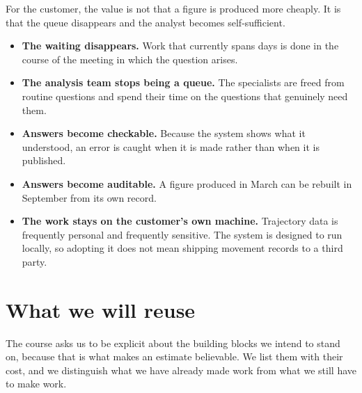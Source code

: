 \documentclass[12pt,a4paper]{report}
\begin{document}
For the customer, the value is not that a figure is produced more cheaply. It is
that the queue disappears and the analyst becomes self-sufficient.

\begin{itemize}
  \item \textbf{The waiting disappears.} Work that currently spans days is done
    in the course of the meeting in which the question arises.
  \item \textbf{The analysis team stops being a queue.} The specialists are
    freed from routine questions and spend their time on the questions that
    genuinely need them.
  \item \textbf{Answers become checkable.} Because the system shows what it
    understood, an error is caught when it is made rather than when it is
    published.
  \item \textbf{Answers become auditable.} A figure produced in March can be
    rebuilt in September from its own record.
  \item \textbf{The work stays on the customer's own machine.} Trajectory data
    is frequently personal and frequently sensitive. The system is designed to
    run locally, so adopting it does not mean shipping movement records to a
    third party.
\end{itemize}

\section{What we will reuse}

The course asks us to be explicit about the building blocks we intend to stand
on, because that is what makes an estimate believable. We list them with their
cost, and we distinguish what we have already made work from what we still have
to make work.
\end{document}
